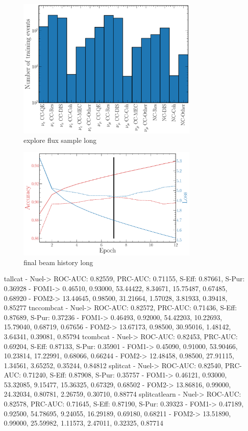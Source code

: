\begin{figure} %
    \includegraphics[width=0.8\textwidth]{diagrams/6-cvn/chipsnet/explore_beam_training_sample.pdf}
    \caption[explore flux sample short]
    {explore flux sample long}
    \label{fig:explore_flux_sample}
\end{figure}

\begin{figure} %
    \includegraphics[width=0.8\textwidth]{diagrams/6-cvn/chipsnet/final_beam_history.pdf}
    \caption[final beam history short]
    {final beam history long}
    \label{fig:final_beam_history}
\end{figure}

tallcat
- Nuel-> ROC-AUC: 0.82559, PRC-AUC: 0.71155, S-Eff: 0.87661, S-Pur: 0.36928
- FOM1-> 0.46510, 0.93000, 53.44422, 8.34671, 15.75487, 0.67485, 0.68920
- FOM2-> 13.44645, 0.98500, 31.21664, 1.57028, 3.81933, 0.39418, 0.85277
tnccombcat
- Nuel-> ROC-AUC: 0.82572, PRC-AUC: 0.71436, S-Eff: 0.87689, S-Pur: 0.37236
- FOM1-> 0.46493, 0.92000, 54.42203, 10.22693, 15.79040, 0.68719, 0.67656
- FOM2-> 13.67173, 0.98500, 30.95016, 1.48142, 3.64341, 0.39081, 0.85794
tcombcat
- Nuel-> ROC-AUC: 0.82453, PRC-AUC: 0.69204, S-Eff: 0.87133, S-Pur: 0.35901
- FOM1-> 0.45090, 0.91000, 53.90466, 10.23814, 17.22991, 0.68066, 0.66244
- FOM2-> 12.48458, 0.98500, 27.91115, 1.34561, 3.65252, 0.35244, 0.84812
splitcat
- Nuel-> ROC-AUC: 0.82540, PRC-AUC: 0.71240, S-Eff: 0.87908, S-Pur: 0.35757
- FOM1-> 0.46121, 0.93000, 53.32085, 9.15477, 15.36325, 0.67329, 0.68502
- FOM2-> 13.86816, 0.99000, 24.32034, 0.80781, 2.26759, 0.30710, 0.88774
splitcatlearn
- Nuel-> ROC-AUC: 0.82578, PRC-AUC: 0.71645, S-Eff: 0.87190, S-Pur: 0.39323
- FOM1-> 0.47189, 0.92500, 54.78695, 9.24055, 16.29189, 0.69180, 0.68211
- FOM2-> 13.51890, 0.99000, 25.59982, 1.11573, 2.47011, 0.32325, 0.87714

